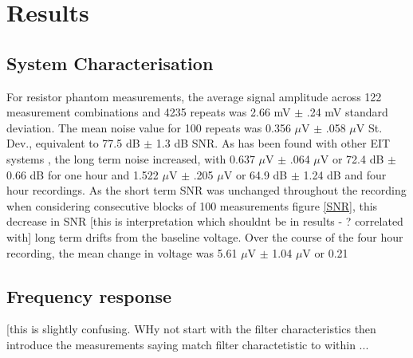 \section{Results}
\subsection{System Characterisation}
For resistor phantom measurements, the average signal amplitude across 122 measurement combinations and 4235 repeats was 2.66 mV $\pm$ .24 mV standard deviation. The mean noise value for 100 repeats was 0.356 $\mu$V $\pm$ .058 $\mu$V St. Dev., equivalent to 77.5 dB $\pm$ 1.3 dB SNR. As has been found with other EIT systems \cite{oh2007multi}, the long term noise increased, with 0.637 $\mu$V $\pm$ .064 $\mu$V or 72.4 dB $\pm$ 0.66 dB for one hour and 1.522 $\mu$V $\pm$ .205 $\mu$V or 64.9 dB $\pm$ 1.24 dB and four hour recordings. As the short term SNR was unchanged throughout the recording when considering consecutive blocks of 100 measurements figure \ref{SNR}, this decrease in SNR [this is interpretation which shouldnt be in results - ? correlated with] long term drifts from the baseline voltage. Over the course of the four hour recording, the mean change in voltage was 5.61 $\mu$V $\pm$ 1.04 $\mu$V or 0.21 %

\subsection{Frequency response}
[this is slightly confusing. WHy not start with the filter characteristics then introduce the measurements saying match filter charactetistic to within ... %